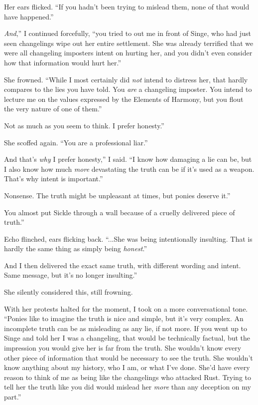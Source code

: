 Her ears flicked. “If you hadn’t been trying to mislead them, none of that would have happened.”

\leavevmode{}\textit{And},” I continued forcefully, “you tried to out me in front of Singe, who had just seen changelings wipe out her entire settlement. She was already terrified that we were all changeling imposters intent on hurting her, and you didn’t even consider how that information would hurt her.”

She frowned. “While I most certainly did \textit{not} intend to distress her, that hardly compares to the lies you have told. You \textit{are} a changeling imposter. You intend to lecture me on the values expressed by the Elements of Harmony, but you flout the very nature of one of them.”

\leavevmode{}Not as much as you seem to think. I prefer honesty.”

She scoffed again. “You are a professional liar.”

\leavevmode{}And that’s \textit{why} I prefer honesty,” I said. “I know how damaging a lie can be, but I also know how much \textit{more} devastating the truth can be if it’s used as a weapon. That’s why intent is important.”

\leavevmode{}Nonsense. The truth might be unpleasant at times, but ponies deserve it.”

\leavevmode{}You almost put Sickle through a wall because of a cruelly delivered piece of truth.”

Echo flinched, ears flicking back. “...She was being intentionally insulting. That is hardly the same thing as simply being \textit{honest}.”

\leavevmode{}And I then delivered the exact same truth, with different wording and intent. Same message, but it’s no longer insulting.”

She silently considered this, still frowning.

With her protests halted for the moment, I took on a more conversational tone. “Ponies like to imagine the truth is nice and simple, but it’s very complex. An incomplete truth can be as misleading as any lie, if not more. If you went up to Singe and told her I was a changeling, that would be technically factual, but the impression you would give her is far from the truth. She wouldn’t know every other piece of information that would be necessary to see the truth. She wouldn’t know anything about my history, who I am, or what I’ve done. She’d have every reason to think of me as being like the changelings who attacked Rust. Trying to tell her the truth like you did would mislead her \textit{more} than any deception on my part.”

